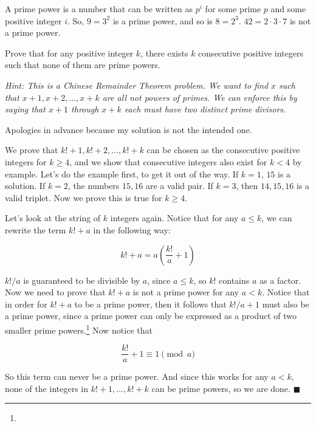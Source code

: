 \documentclass[11pt]{article}
\begin{document}
\pagebreak
{}

A prime power is a number that can be written as $p^i$ for some prime $p$ and some
positive integer $i$. So, $9 = 3^2$ is a prime power, and so is $8 = 2^3$. $42 = 2 \cdot 3 \cdot 7$ is not
a prime power.

Prove that for any positive integer $k$, there exists $k$ consecutive positive integers
such that none of them are prime powers.

\emph{Hint: This is a Chinese Remainder Theorem problem. We want to find $x$ such that $x + 1, x + 2, \ldots, x+k$ are all not powers of primes. We can enforce this by saying that $x+1$ through $x+k$ each must have two distinct prime divisors.}


\begin{solution}
  Apologies in advance because my solution is not the intended one. 
  
  We prove that $k! + 1, k! + 2, \dots, k! + k$ can be chosen as the consecutive positive integers for $k \ge 4$, and we show that consecutive integers also exist for $k < 4$ by example. Let's do the example first, to get it out of the way. If $k = 1$, $15$ is a solution. If $k = 2$, the numbers $15, 16$ are a valid pair. If $k = 3$, then $14, 15, 16$ is a valid triplet. Now we prove this is true for $k \ge 4$. 

  Let's look at the string of $k$ integers again. Notice that for any $a \le k$, we can rewrite the term $k! + a$ in the following way:

  \[k! + a = a\left(\frac{k!}{a} + 1\right)\]

  $k!/a$ is guaranteed to be divisible by $a$, since $a \le k$, so $k!$ contains $a$ as a factor. Now we need to prove that $k! + a$ is not a prime power for any $a < k$. Notice that in order for $k! + a$ to be a prime power, then it follows that $k!/a + 1$ must also be a prime power, since a prime power can only be expressed as a product of two smaller prime powers.\footnote{{\color{blue}{We can prove this is true by noticing that for any $b$ given prime $a$: \[ a^n b = a^m \implies b = \frac{a^m}{a^n} = a^{m-n}\] which is clearly a prime power.}}} Now notice that 
  
  \[\frac{k!}{a} + 1 \equiv 1 \pmod {a}\]

  So this term can never be a prime power. And since this works for any $a < k$, none of the integers in $k! + 1, \dots, k! +k$ can be prime powers, so we are done. $\blacksquare$
\end{solution}
\end{document}
